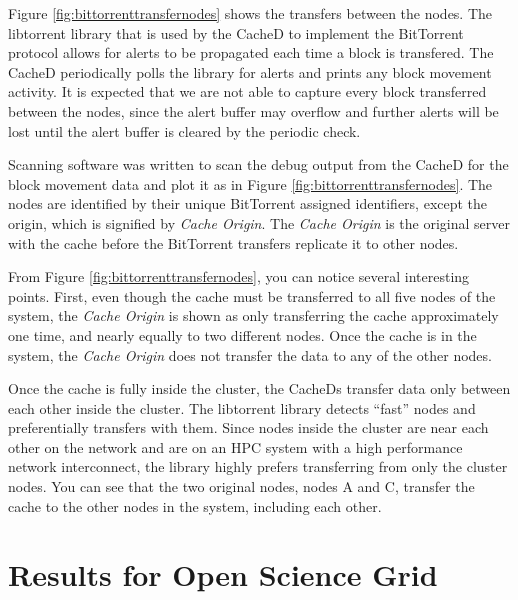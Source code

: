 Figure \ref{fig:bittorrenttransfernodes} shows the transfers between the nodes.  The libtorrent library that is used by the CacheD to implement the BitTorrent protocol allows for alerts to be propagated each time a block is transfered.  The CacheD periodically polls the library for alerts and prints any block movement activity. It is expected that we are not able to capture every block transferred between the nodes, since the alert buffer may overflow and further alerts will be lost until the alert buffer is cleared by the periodic check.

Scanning software was written to scan the debug output from the CacheD for the block movement data and plot it as in Figure \ref{fig:bittorrenttransfernodes}.  The nodes are identified by their unique BitTorrent assigned identifiers, except the origin, which is signified by \textit{Cache Origin}.  The \textit{Cache Origin} is the original server with the cache before the BitTorrent transfers replicate it to other nodes.

From Figure \ref{fig:bittorrenttransfernodes}, you can notice several interesting points.  First, even though the cache must be transferred to all five nodes of the system, the \textit{Cache Origin} is shown as only transferring the cache approximately one time, and nearly equally to two different nodes.  Once the cache is in the system, the \textit{Cache Origin} does not transfer the data to any of the other nodes.  

Once the cache is fully inside the cluster, the CacheDs transfer data only between each other inside the cluster.  The libtorrent library detects ``fast'' nodes and preferentially transfers with them.  Since nodes inside the cluster are near each other on the network and are on an HPC system with a high performance network interconnect, the library highly prefers transferring from only the cluster nodes.  You can see that the two original nodes, nodes A and C, transfer the cache to the other nodes in the system, including each other.


\section{Results for Open Science Grid}

